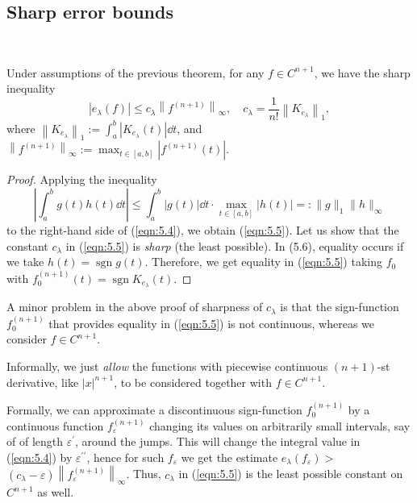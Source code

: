 \documentclass[a4paper]{article}
\renewcommand{\epsilon}{\varepsilon}
\begin{document}
\subsection{Sharp error bounds}
\ \vspace*{-1.5em}
\begin{theorem}
    Under assumptions of the previous theorem, for any $f \in C^{n+1}$, we have the sharp inequality
\begin{equation}\label{eqn:5.5}
    \left|e_\lambda(f)\right| \leq c_\lambda\left\|f^{(n+1)}\right\|_{\infty}, \quad c_\lambda=\frac{1}{n !}\left\|K_{e_\lambda}\right\|_1,
\end{equation}
where $\left\|K_{e_\lambda}\right\|_1:=\int_a^b\left|K_{e_\lambda}(t)\right| \dd{t}$, and $\left\|f^{(n+1)}\right\|_{\infty}:=\max _{t \in[a, b]}\left|f^{(n+1)}(t)\right|$.
\end{theorem}
\begin{proof}
    Applying the inequality
\begin{equation}\label{eqn:5.6}
    \left|\int_a^b g(t) h(t) \dd{t}\right| \leq \int_a^b|g(t)| \dd{t} \cdot \max _{t \in[a, b]}|h(t)|=:\|g\|_1\|h\|_{\infty}
\end{equation}
to the right-hand side of (\ref{eqn:5.4}), we obtain (\ref{eqn:5.5}).
Let us show that the constant $c_\lambda$ in (\ref{eqn:5.5}) is \textit{sharp} (the least possible). In (5.6), equality occurs if we take $h(t)=\operatorname{sgn} g(t)$. Therefore, we get equality in (\ref{eqn:5.5}) taking $f_0$ with $f_0^{(n+1)}(t)=\operatorname{sgn} K_{e_\lambda}(t)$.
\end{proof}
\begin{remark}
    A minor problem in the above proof of sharpness of $c_\lambda$ is that the sign-function $f_0^{(n+1)}$ that provides equality in (\ref{eqn:5.5}) is not continuous, whereas we consider $f \in C^{n+1}$.

Informally, we just \textit{allow} the functions with piecewise continuous $(n+1)$-st derivative, like $|x|^{n+1}$, to be considered together with $f \in C^{n+1}$.

Formally, we can approximate a discontinuous sign-function $f_0^{(n+1)}$ by a continuous function $f_\epsilon^{(n+1)}$ changing its values on arbitrarily small intervals, say of of length $\epsilon^{\prime}$, around the jumps. This will change the integral value in (\ref{eqn:5.4}) by $\epsilon^{\prime \prime}$, hence for such $f_\epsilon$ we get the estimate $e_\lambda\left(f_\epsilon\right)>$ $\left(c_\lambda-\epsilon\right)\left\|f_\epsilon^{(n+1)}\right\|_{\infty}$. Thus, $c_\lambda$ in (\ref{eqn:5.5}) is the least possible constant on $C^{n+1}$ as well.
\end{remark}
\end{document}
